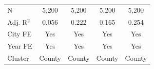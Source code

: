 \begin{tabular*}{\textwidth}{@{\extracolsep{\fill}}lcccc}
   \hline
   N         & 5,200                           & 5,200                               & 5,200                              & 5,200\\  
   Adj. R$^2$       & 0.056                           & 0.222                               & 0.165                              & 0.254\\  
   City FE              & Yes                             & Yes                                 & Yes                                & Yes\\  
   Year FE              & Yes                             & Yes                                 & Yes                                & Yes\\  
   Cluster              & County & County & County & County\\  
   \bottomrule
\end{tabular*}
\par\endgroup
